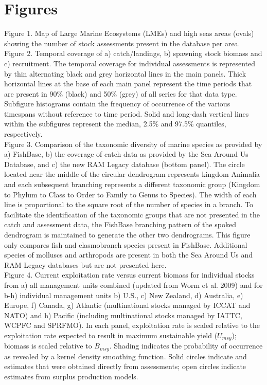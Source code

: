 \documentclass[letterpaper,12pt]{article}
\begin{document}

\section*{Figures}
\noindent Figure 1. Map of Large Marine Ecosystems (LMEs) and high seas areas (ovals) showing the number of stock assessments present in the database per area. 
\\

\noindent Figure 2. Temporal coverage of a) catch/landings, b) spawning stock biomass and c) recruitment. The temporal coverage for individual assessments is represented by thin alternating black and grey horizontal lines in the main panels. Thick horizontal lines at the base of each main panel represent the time periods that are present in 90\% (black) and 50\% (grey) of all series for that data type. Subfigure histograms contain the frequency of occurrence of the various timespans without reference to time period. Solid and long-dash vertical lines within the subfigures represent the median, 2.5\% and 97.5\% quantiles, respectively.
\\


\noindent Figure 3. Comparison of the taxonomic diversity of marine species as provided by a)
FishBase, b) the coverage of catch data as provided by the Sea Around Us
Database, and c) the new RAM Legacy database (bottom panel). The circle
located near the middle of the circular dendrogram represents kingdom Animalia and
each subsequent branching represents a different taxonomic group (Kingdom to Phylum
to Class to Order to Family to Genus to Species). The width of each line is proportional
to the square root of the number of species in a branch. To facilitate the identification
of the taxonomic groups that are not presented in the catch and assessment data, the
FishBase branching pattern of the spoked dendrogram is maintained to generate the
other two dendrograms. This figure only compares fish and elasmobranch species present in FishBase. Additional species of molluscs and arthropods are present in both the Sea Around Us and RAM Legacy databases but are not presented here.
\\

\noindent Figure 4.  Current exploitation rate versus current biomass for individual stocks from a) all management units combined (updated from Worm et al. 2009) and for b-h) individual management units b) U.S., c) New Zealand, d) Australia, e) Europe, f) Canada, g) Atlantic (multinational stocks managed by ICCAT and NATO) and h) Pacific (including multinational stocks managed by IATTC, WCPFC and SPRFMO). In each panel, exploitation rate is scaled relative to the exploitation rate expected to result in maximum sustainable yield ($U_{msy}$); biomass is scaled relative to $B_{msy}$. Shading indicates the probability of occurrence as revealed by a kernel density smoothing function. Solid circles indicate and estimates that were obtained directly from assessments; open circles indicate estimates from surplus production models. 
\\
\end{document}
